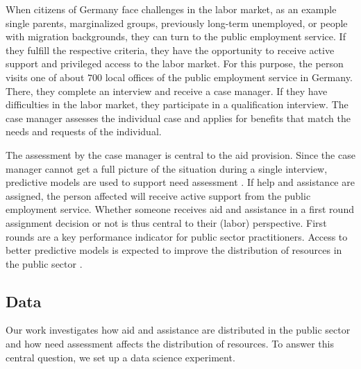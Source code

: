 When citizens of Germany face challenges in the labor market, as an example single parents, marginalized groups, previously long-term unemployed, or people with migration backgrounds, they can turn to the public employment service. If they fulfill the respective criteria, they have the opportunity to receive active support and privileged access to the labor market. For this purpose, the person visits one of about $700$ local offices of the public employment service in Germany. There, they complete an interview and receive a case manager. If they have difficulties in the labor market, they participate in a qualification interview. The case manager assesses the individual case and applies for benefits that match the needs and requests of the individual.

The assessment by the case manager is central to the aid provision. Since the case manager cannot get a full picture of the situation during a single interview, predictive models are used to support need assessment \cite{wirtz2019artificial}. If help and assistance are assigned, the person affected will receive active support from the public employment service. Whether someone receives aid and assistance in a first round assignment decision or not is thus central to their (labor) perspective. First rounds are a key performance indicator for public sector practitioners. Access to better predictive models is expected to improve the distribution of resources in the public sector \cite{blumenstock2016}.

\subsection{Data}
\label{sec:data_data}

Our work investigates how aid and assistance are distributed in the public sector and how need assessment affects the distribution of resources. To answer this central question, we set up a data science experiment.

